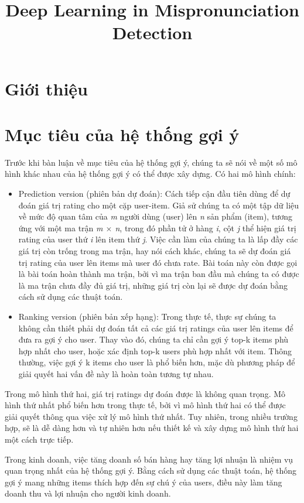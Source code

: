 \documentclass[14pt]{article}
\title{\vspace{-1.5cm} Deep Learning in Mispronunciation Detection}
\date{}
\begin{document}
	\section{Giới thiệu}
	 	
	\section{Mục tiêu của hệ thống gợi ý}
	Trước khi bàn luận về mục tiêu của hệ thống gợi ý, chúng ta sẽ nói về một số mô hình khác nhau của hệ thống gợi ý có thể được xây dựng. Có hai mô hình chính:
	\begin{itemize}
		\item Prediction version (phiên bản dự đoán): Cách tiếp cận đầu tiên dùng để dự đoán giá trị rating cho một cặp user-item. Giả sử chúng ta có một tập dữ liệu về mức độ quan tâm của \textit{m} người dùng (user) lên \textit{n} sản phẩm (item), tương ứng với một ma trận \textit{m $\times$ n}, trong đó phần tử ở hàng \textit{i}, cột \textit{j} thể hiện giá trị rating của user thứ \textit{i} lên item thứ \textit{j}. Việc cần làm của chúng ta là lấp đầy các giá trị còn trống trong ma trận, hay nói cách khác, chúng ta sẽ dự đoán giá trị rating của user lên items mà user đó chưa rate. Bài toán này còn được gọi là bài toán hoàn thành ma trận, bởi vì ma trận ban đầu mà chúng ta có được là ma trận chưa đầy đủ giá trị, những giá trị còn lại sẽ được dự đoán bằng cách sử dụng các thuật toán.
		
		\item Ranking version (phiên bản xếp hạng): Trong thực tế, thực sự chúng ta không cần thiết phải dự đoán tất cả các giá trị ratings của user lên items để đưa ra gợi ý cho user. Thay vào đó, chúng ta chỉ cần gợi ý top-k items phù hợp nhất cho user, hoặc xác định top-k users phù hợp nhất với item. Thông thường, việc gợi ý k items cho user là phổ biến hơn, mặc dù phương pháp để giải quyết hai vấn đề này là hoàn toàn tương tự nhau. 
	\end{itemize}
	
	Trong mô hình thứ hai, giá trị ratings dự đoán được là không quan trọng. Mô hình thứ nhất phổ biến hơn trong thực tế, bởi vì mô hình thứ hai có thể được giải quyết thông qua việc xử lý mô hình thứ nhất. Tuy nhiên, trong nhiều trường hợp, sẽ là dễ dàng hơn và tự nhiên hơn nếu thiết kế và xây dựng mô hình thứ hai một cách trực tiếp.
	
	Trong kinh doanh, việc tăng doanh số bán hàng hay tăng lợi nhuận là nhiệm vụ quan trọng nhất của hệ thống gợi ý. Bằng cách sử dụng các thuật toán, hệ thống gợi ý mang những items thích hợp đến sự chú ý của users, điều này làm tăng doanh thu và lợi nhuận cho người kinh doanh.
\end{document}
